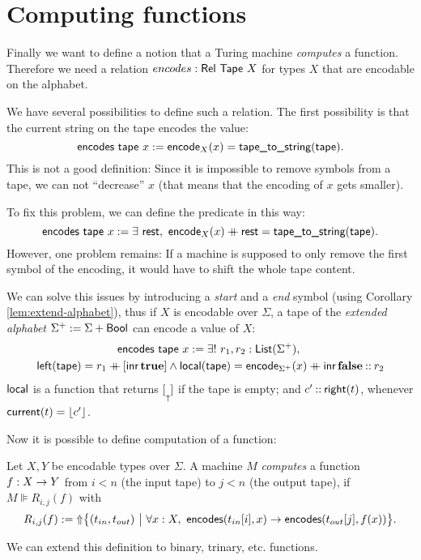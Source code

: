 \documentclass{psartcl}
\begin{document}
\section{Computing functions}

Finally we want to define a notion that a Turing machine \emph{computes} a function.
Therefore we need a relation $encodes : \mathsf{Rel}~\textsf{Tape}~X$ for types $X$ that are encodable on the alphabet.

We have several possibilities to define such a relation.  The first possibility is that the current string on the tape encodes the value:
$$\textsf{encodes}~\textsf{tape}~x:= \textsf{encode}_X(x) = \textsf{tape\_to\_string}(\textsf{tape}).$$
This is not a good definition: Since it is impossible to remove symbols from a tape, we can not ``decrease'' $x$ (that means that the encoding of
$x$ gets smaller).

To fix this problem, we can define the predicate in this way:
$$\textsf{encodes}~\textsf{tape}~x := \exists~\textsf{rest},~\textsf{encode}_X(x) \mathbin{+\mkern-10mu+} \textsf{rest} = \textsf{tape\_to\_string}(\textsf{tape}).$$
However, one problem remains:  If a machine is supposed to only remove the first symbol of the encoding, it would have to shift the whole tape
content.

We can solve this issues by introducing a \emph{start} and a \emph{end} symbol (using Corollary \ref{lem:extend-alphabet}), thus if $X$ is
encodable over $\Sigma$, a tape of the \emph{extended alphabet} $\Sigma^+ := \Sigma + \textsf{Bool}$ can encode a value of $X$:
\begin{multline*}
  \textsf{encodes}~\textsf{tape}~x:= \exists!~r_1, r_2 : \textsf{List}(\Sigma^+),~\\
  \textsf{left}(\textsf{tape}) = r_1 \mathbin{+\mkern-10mu+} [\operatorname{\textsf{inr}} \mathbf{true}] \land
  \textsf{local}(\textsf{tape}) = \textsf{encode}_{\Sigma^+}(x) \mathbin{+\mkern-10mu+} \operatorname{\textsf{inr}} \mathbf{false} \mathbin{::} r_2
\end{multline*}
$\textsf{local}$ is a function that returns $[ \underset{\uparrow}{} ]$ if the tape is empty; and $c' \mathbin{::} \textsf{right}(t)$, whenever $\textsf{current}(t) = \left\lfloor {c'}\right\rfloor$.

Now it is possible to define computation of a function:
\begin{definition}
  \label{def:computes}
  Let $X, Y$ be encodable types over $\Sigma$.  A machine $M$ \emph{computes} a function $f : X \rightarrow Y$ from $i < n$ (the
  input tape) to $j < n$ (the output tape), if
  $M \VDash R_{i,j}(f)$ with
  $$R_{i,j}(f) :=  \operatorname{\Uparrow} \bigl\{ (t_{in}, t_{out})~\big|~\forall x:X,~ \textsf{encodes}(t_{in}[i], x) \rightarrow \textsf{encodes}(t_{out}[j], f(x)) \bigr \}.$$
\end{definition}
We can extend this definition to binary, trinary, etc. functions.
\end{document}
